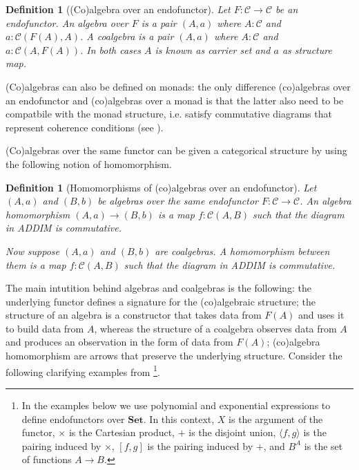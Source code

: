 \documentclass[12pt,a4paper,openright,twoside]{report}
\theoremstyle{plain}
\newtheorem{definition}[proposition]{Definition}
\theoremstyle{definition}
\begin{document}
\begin{definition}[(Co)algebra over an endofunctor]
  \label{def: endalg}
  Let $F: \mathcal{C} \to \mathcal{C}$ be an endofunctor. An algebra over $F$ is a pair $(A,a)$ where $A: \mathcal{C}$ and $a:\mathcal{C}(F(A),A)$. A coalgebra is a pair $(A,a)$ where $A: \mathcal{C}$ and $a:\mathcal{C}(A,F(A))$. In both cases $A$ is known as carrier set and $a$ as structure map.
\end{definition}

(Co)algebras can also be defined on monads: the only difference (co)algebras over an endofunctor and (co)algebras over a monad is that the latter also need to be compatbile with the monad structure, i.e. satisfy commutative diagrams that represent coherence conditions (see \cite{gavranovicposition}).


(Co)algebras over the same functor can be given a categorical structure by using the following notion of homomorphism.

\begin{definition}[Homomorphisms of (co)algebras over an endofunctor]
  Let $(A,a)$ and $(B,b)$ be algebras over the same endofunctor $F: \mathcal{C} \to \mathcal{C}$. An algebra homomorphism $(A,a)\to (B,b)$ is a map $f: \mathcal{C}(A,B)$ such that the diagram in ADDIM is commutative.


  Now suppose $(A,a)$ and $(B,b)$ are coalgebras. A homomorphism between them is a map $f: \mathcal{C}(A,B)$ such that the diagram in ADDIM is commutative.
\end{definition}

The main intutition behind algebras and coalgebras is the following: the underlying functor defines a signature for the (co)algebraic structure; the structure of an algebra is a constructor that takes data from $F(A)$ and uses it to build data from $A$, whereas the structure of a coalgebra observes data from $A$ and produces an observation in the form of data from $F(A)$; (co)algebra homomorphism are arrows that preserve the underlying structure. Consider the following clarifying examples from \cite{gavranovicposition}\footnote{In the examples below we use polynomial and exponential expressions to define endofunctors over $\mathbf{Set}$. In this context, $X$ is the argument of the functor, $\times$ is the Cartesian product, $+$ is the disjoint union, $\langle f,g \rangle$ is the pairing induced by $\times$, $[f,g]$ is the pairing induced by $+$, and $B^A$ is the set of functions $A \to B$.}.
\end{document}
